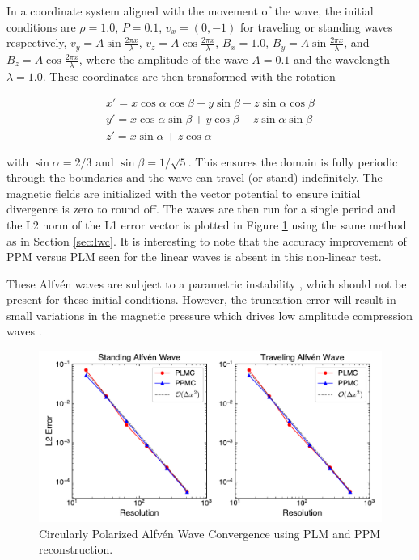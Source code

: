 \documentclass[modern]{aastex631}
\newcommand*{\img}[1]{%
    \raisebox{-.05\baselineskip}{%
        \texttt{[image: \#1]}%
    }%
}
\begin{document}
In a coordinate system aligned with the movement of the wave, the initial conditions are
$\rho = 1.0$,
$P = 0.1$,
$v_x = (0,-1)$ for traveling or standing waves respectively,
$v_y = A \sin{\frac{2\pi x}{\lambda}}$,
$v_z = A \cos{\frac{2\pi x}{\lambda}}$,
$B_x = 1.0$,
$B_y = A \sin{\frac{2\pi x}{\lambda}}$,
and $B_z = A \cos{\frac{2\pi x}{\lambda}}$,
where the amplitude of the wave $A = 0.1$ and the wavelength $\lambda = 1.0$. These coordinates are then transformed with the rotation

\begin{eqnarray}
    x\prime = x \cos\alpha\cos\beta - y \sin\beta - z \sin\alpha\cos\beta \nonumber \\
    y\prime = x \cos\alpha\sin\beta + y \cos\beta - z \sin\alpha\sin\beta \nonumber \\
    z\prime = x \sin\alpha + z \cos\alpha \nonumber
\end{eqnarray}

\noindent with $\sin\alpha = 2/3$ and $\sin\beta = 1/\sqrt{5}$. This ensures the domain is fully periodic through the boundaries and the wave can travel (or stand) indefinitely. The magnetic fields are initialized with the vector potential to ensure initial divergence is zero to round off. The waves are then run for a single period and the L2 norm of the L1 error vector is plotted in Figure \ref{fig:cpaw} using the same method as in Section \ref{sec:lwc}. It is interesting to note that the accuracy improvement of PPM versus PLM seen for the linear waves is absent in this non-linear test.

These Alfv\'en waves are subject to a parametric instability \citep{del_zanna_parametric_2001}, which should not be present for these initial conditions. However, the truncation error will result in small variations in the magnetic pressure which drives low amplitude compression waves \citep{stone_athena_2008}.

\begin{figure}[ht!]
    \includegraphics[width=\linewidth]{cpaw_convergence.pdf}
    \caption{Circularly Polarized Alfv\'en Wave Convergence using PLM and PPM reconstruction. \href{https://zenodo.org/records/10927223}{\img{zenodo-gradient-200.png}}}
    \label{fig:cpaw}
\end{figure}
\end{document}

